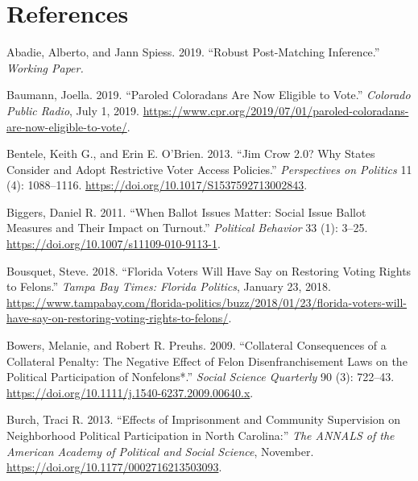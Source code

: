 \documentclass[
  12pt,
]{article}
\newlength{\cslhangindent}
\newenvironment{cslreferences}%
  {\setlength{\parindent}{0pt}%
  \everypar{\setlength{\hangindent}{\cslhangindent}}\ignorespaces}%
  {\par}
\begin{document}
\begin{singlespace}

\end{singlespace}

\newpage

\hypertarget{references}{%
\section*{References}\label{references}}

\hypertarget{refs}{}
\begin{cslreferences}
\leavevmode\hypertarget{ref-Abadie2019}{}%
Abadie, Alberto, and Jann Spiess. 2019. ``Robust Post-Matching Inference.'' \emph{Working Paper.}

\leavevmode\hypertarget{ref-Baumann2019}{}%
Baumann, Joella. 2019. ``Paroled Coloradans Are Now Eligible to Vote.'' \emph{Colorado Public Radio}, July 1, 2019. \url{https://www.cpr.org/2019/07/01/paroled-coloradans-are-now-eligible-to-vote/}.

\leavevmode\hypertarget{ref-Bentele2013}{}%
Bentele, Keith G., and Erin E. O'Brien. 2013. ``Jim Crow 2.0? Why States Consider and Adopt Restrictive Voter Access Policies.'' \emph{Perspectives on Politics} 11 (4): 1088--1116. \url{https://doi.org/10.1017/S1537592713002843}.

\leavevmode\hypertarget{ref-Biggers2011}{}%
Biggers, Daniel R. 2011. ``When Ballot Issues Matter: Social Issue Ballot Measures and Their Impact on Turnout.'' \emph{Political Behavior} 33 (1): 3--25. \url{https://doi.org/10.1007/s11109-010-9113-1}.

\leavevmode\hypertarget{ref-Bousquet2018}{}%
Bousquet, Steve. 2018. ``Florida Voters Will Have Say on Restoring Voting Rights to Felons.'' \emph{Tampa Bay Times: Florida Politics}, January 23, 2018. \url{https://www.tampabay.com/florida-politics/buzz/2018/01/23/florida-voters-will-have-say-on-restoring-voting-rights-to-felons/}.

\leavevmode\hypertarget{ref-Bowers2009}{}%
Bowers, Melanie, and Robert R. Preuhs. 2009. ``Collateral Consequences of a Collateral Penalty: The Negative Effect of Felon Disenfranchisement Laws on the Political Participation of Nonfelons*.'' \emph{Social Science Quarterly} 90 (3): 722--43. \url{https://doi.org/10.1111/j.1540-6237.2009.00640.x}.

\leavevmode\hypertarget{ref-Burch2013}{}%
Burch, Traci R. 2013. ``Effects of Imprisonment and Community Supervision on Neighborhood Political Participation in North Carolina:'' \emph{The ANNALS of the American Academy of Political and Social Science}, November. \url{https://doi.org/10.1177/0002716213503093}.


\end{cslreferences}
\end{document}
